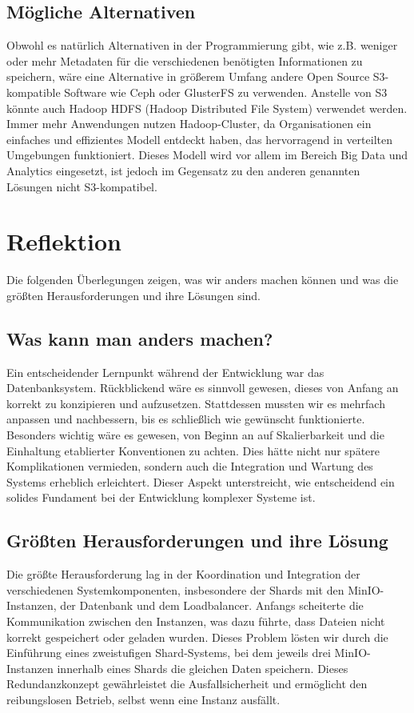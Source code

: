 \documentclass[12pt]{report}
\begin{document}
	\section{Mögliche Alternativen}
		Obwohl es natürlich Alternativen in der Programmierung gibt, wie z.B. weniger oder mehr Metadaten für die verschiedenen benötigten Informationen zu speichern, wäre eine Alternative in größerem Umfang andere Open Source S3-kompatible Software wie Ceph oder GlusterFS zu verwenden. Anstelle von S3 könnte auch Hadoop HDFS (Hadoop Distributed File System) verwendet werden. Immer mehr Anwendungen nutzen Hadoop-Cluster, da Organisationen ein einfaches und effizientes Modell entdeckt haben, das hervorragend in verteilten Umgebungen funktioniert. \cite{ghazi2015hadoop} Dieses Modell wird vor allem im Bereich Big Data und Analytics eingesetzt, ist jedoch im Gegensatz zu den anderen genannten Lösungen nicht S3-kompatibel.
	
\chapter{Reflektion}
	Die folgenden Überlegungen zeigen, was wir anders machen können und was die größten Herausforderungen und ihre Lösungen sind.
	
	\section{Was kann man anders machen?}
	Ein entscheidender Lernpunkt während der Entwicklung war das Datenbanksystem. Rückblickend wäre es sinnvoll gewesen, dieses von Anfang an korrekt zu konzipieren und aufzusetzen. Stattdessen mussten wir es mehrfach anpassen und nachbessern, bis es schließlich wie gewünscht funktionierte. Besonders wichtig wäre es gewesen, von Beginn an auf Skalierbarkeit und die Einhaltung etablierter Konventionen zu achten. Dies hätte nicht nur spätere Komplikationen vermieden, sondern auch die Integration und Wartung des Systems erheblich erleichtert. Dieser Aspekt unterstreicht, wie entscheidend ein solides Fundament bei der Entwicklung komplexer Systeme ist.
	
	\section{Größten Herausforderungen und ihre Lösung}
	Die größte Herausforderung lag in der Koordination und Integration der verschiedenen Systemkomponenten, insbesondere der Shards mit den MinIO-Instanzen, der Datenbank und dem Loadbalancer. Anfangs scheiterte die Kommunikation zwischen den Instanzen, was dazu führte, dass Dateien nicht korrekt gespeichert oder geladen wurden. Dieses Problem lösten wir durch die Einführung eines zweistufigen Shard-Systems, bei dem jeweils drei MinIO-Instanzen innerhalb eines Shards die gleichen Daten speichern. Dieses Redundanzkonzept gewährleistet die Ausfallsicherheit und ermöglicht den reibungslosen Betrieb, selbst wenn eine Instanz ausfällt.
	
\end{document}
